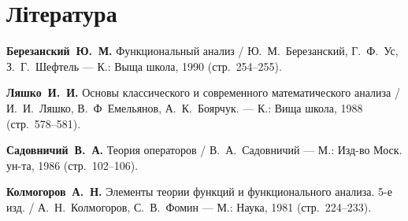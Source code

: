 \section{Література}

\begin{enumerate}[label={[\arabic*]}]
\item \textbf{Березанский~Ю.~М.}
Функциональный анализ /
Ю.~М.~Березанский, Г.~Ф.~Ус, З.~Г.~Шефтель ---
К.: Выща школа, 1990 (стр.~254--255).
\item \textbf{Ляшко~И.~И.}
Основы классического и современного математического анализа /
И.~И.~Ляшко, В.~Ф~Емельянов, А.~К.~Боярчук. ---
К.: Вища школа, 1988 (стр.~578--581).
\item \textbf{Садовничий~В.~А.}
Теория операторов /
В.~А.~Садовничий ---
М.: Изд-во Моск. ун-та, 1986 (стр.~102--106).
\item \textbf{Колмогоров~А.~Н.}
Элементы теории функций и функционального анализа. 5-е изд. /
А.~Н.~Колмогоров, С.~В.~Фомин ---
М.: Наука, 1981 (стр.~224--233).
\end{enumerate}
